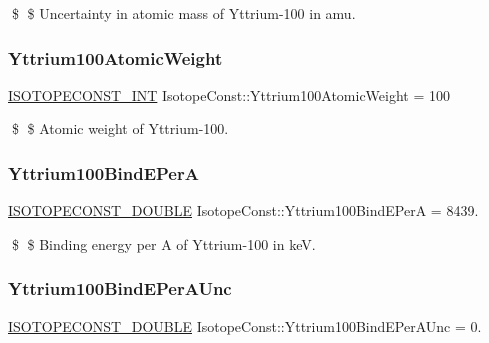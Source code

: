 \$ \$ Uncertainty in atomic mass of Yttrium-\/100 in amu. \mbox{\label{group___isotope_const-_yttrium-_y100_ga7cd223f77ba880f7defbbbf112046bf8}} 
\subsubsection{\texorpdfstring{Yttrium100\+Atomic\+Weight}{Yttrium100AtomicWeight}}
{\footnotesize\ttfamily \mbox{\hyperlink{group___isotope_const-_macros_ga5f18360b3e99483a35c32d789e62621c}{I\+S\+O\+T\+O\+P\+E\+C\+O\+N\+S\+T\+\_\+\+I\+NT}} Isotope\+Const\+::\+Yttrium100\+Atomic\+Weight = 100}

\$ \$ Atomic weight of Yttrium-\/100. \mbox{\label{group___isotope_const-_yttrium-_y100_ga573424f4a1bd4346028d286c0c639f25}} 
\subsubsection{\texorpdfstring{Yttrium100\+Bind\+E\+PerA}{Yttrium100BindEPerA}}
{\footnotesize\ttfamily \mbox{\hyperlink{group___isotope_const-_macros_ga8f45a7272ce02c0b4c65c44636ed719a}{I\+S\+O\+T\+O\+P\+E\+C\+O\+N\+S\+T\+\_\+\+D\+O\+U\+B\+LE}} Isotope\+Const\+::\+Yttrium100\+Bind\+E\+PerA = 8439.}

\$ \$ Binding energy per A of Yttrium-\/100 in keV. \mbox{\label{group___isotope_const-_yttrium-_y100_ga5468d526ab3e4c0202b6ff75aa3f5380}} 
\subsubsection{\texorpdfstring{Yttrium100\+Bind\+E\+Per\+A\+Unc}{Yttrium100BindEPerAUnc}}
{\footnotesize\ttfamily \mbox{\hyperlink{group___isotope_const-_macros_ga8f45a7272ce02c0b4c65c44636ed719a}{I\+S\+O\+T\+O\+P\+E\+C\+O\+N\+S\+T\+\_\+\+D\+O\+U\+B\+LE}} Isotope\+Const\+::\+Yttrium100\+Bind\+E\+Per\+A\+Unc = 0.}

